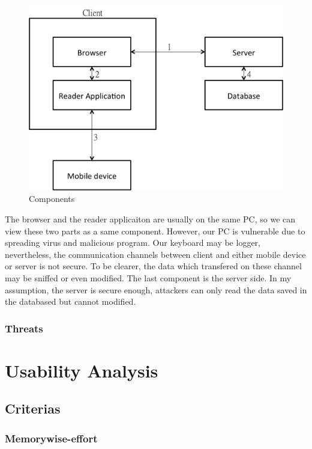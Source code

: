 \begin{CJK}{Bg5}{bsmi}
\begin{figure}
\centering
\includegraphics[scale=0.6]{picture/compose-element.png}
\caption{Components}
\label{fig:compose-element}
\end{figure}

The browser and the reader applicaiton are usually on the same PC, so we can view these two parts as a same component. However, our PC is vulnerable due to spreading virus and malicious program. Our keyboard may be logger, nevertheless, the communication channels between client and either mobile device or server is not secure. To be clearer, the data which transfered on these channel may be sniffed or even modified. The last component is the server side. In my assumption, the server is secure enough, attackers can only read the data saved in the databased but cannot modified.

\subsubsection{Threats}


\section{Usability Analysis}

\subsection{Criterias}

\subsubsection{Memorywise-effort}


\end{CJK}
